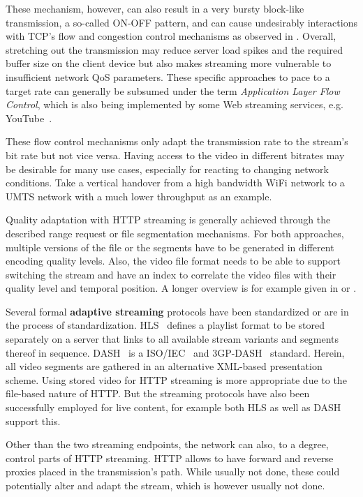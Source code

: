 These mechanism, however, can also result in a very bursty block-like transmission, a so-called ON-OFF pattern, and can cause undesirably interactions with \gls{TCP}'s flow and congestion control mechanisms as observed in \cite{alcock2011afcyt}. Overall, stretching out the transmission may reduce server load spikes and the required buffer size on the client device but also makes streaming more vulnerable to insufficient network \gls{QoS} parameters. These specific approaches to pace to a target rate can generally be subsumed under the term \textit{Application Layer Flow Control}, which is also being implemented by some Web streaming services, e.g. YouTube~\cite{metzger2011delivery}.

These flow control mechanisms only adapt the transmission rate to the stream's bit rate but not vice versa. Having access to the video in different bitrates may be desirable for many use cases, especially for reacting to changing network conditions. Take a vertical handover from a high bandwidth WiFi network to a \gls{UMTS} network with a much lower throughput as an example. 

Quality adaptation with \gls{HTTP} streaming is generally achieved through the described range request or file segmentation mechanisms. For both approaches, multiple versions of the file or the segments have to be generated in different encoding quality levels. Also, the video file format needs to be able to support switching the stream and have an index to correlate the video files with their quality level and temporal position. A longer overview is for example given in \cite{ma2011mobile} or \cite{watching-video1}.

Several formal \textbf{adaptive streaming} protocols have been standardized or are in the process of standardization. \gls{HLS}~\cite{pantos2011livestreaming} defines a playlist format to be stored separately on a server that links to all available stream variants and segments thereof in sequence. \gls{DASH}~\cite{Stockhammer:2011:DAS:1943552.1943572} is a \gls{ISO}/\gls{IEC}~\cite{iso-iec-23009-1} and 3GP-DASH~\cite{3gpp.26.247} standard. Herein, all video segments are gathered in an alternative \acrshort{XML}-based presentation scheme. Using stored video for \gls{HTTP} streaming is more appropriate due to the file-based nature of \gls{HTTP}. But the streaming protocols have also been successfully employed for live content, for example both \gls{HLS} as well as \gls{DASH} support this.

Other than the two streaming endpoints, the network can also, to a degree, control parts of \gls{HTTP} streaming. \gls{HTTP} allows to have forward and reverse proxies placed in the transmission's path. While usually not done, these could potentially alter and adapt the stream, which is however usually not done. 

